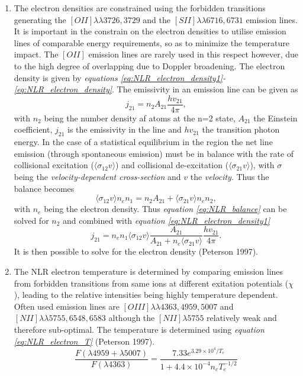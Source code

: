 \documentclass[a4paper, 12pt, twoside]{article}
\begin{document}
\begin{enumerate}
\item The electron densities are constrained using the forbidden transitions generating the $[OII] \lambda\lambda 3726,3729$ and the $[SII] \lambda\lambda 6716,6731$ emission lines. It is important in the constrain on the electron densities to utilise emission lines of comparable energy requirements, so as to minimize the temperature impact. The $[OII]$ emission lines are rarely used in this respect however, due to the high degree of overlapping due to Doppler broadening. The electron density is given by \emph{equations \ref{eq:NLR_electron_density1}-\ref{eq:NLR_electron_density}}. The emissivity in an emission line can be given as
\begin{equation}
j_{21} = n_{2}A_{21}\frac{hv_{21}} {4\pi},
\label{eq:NLR_electron_density1}
\end{equation}
with $n_{2}$ being the number density af atoms at the n=2 state, $A_{21}$ the Einstein coefficient, $j_{21}$ is the emissivity in the line and $hv_{21}$ the transition photon energy. In the case of a statistical equilibrium in the region the net line emission (through spontaneous emission) must be in balance with the rate of collisional excitation ($\langle\sigma_{12}v\rangle$) and collisional de-excitation ($\langle\sigma_{21}v\rangle$), with $\sigma$ being the \emph{velocity-dependent cross-section} and $v$ the \emph{velocity}. Thus the balance becomes
\begin{equation}
\langle\sigma_{12}v\rangle n_{e}n_{1} = n_{2}A_{21} + \langle\sigma_{21}v\rangle n_{e}n_{2},
\label{eq:NLR_balance}
\end{equation}
with $n_{e}$ being the electron density. Thus \emph{equation \ref{eq:NLR_balance}} can be solved for $n_{2}$ and combined with \emph{equation \ref{eq:NLR_electron_density1}}
\begin{equation}
j_{21} = n_{e}n_{1}\langle\sigma_{12}v\rangle \frac{A_{21}}{A_{21}+n_{e}\langle\sigma_{21}v\rangle}\frac{hv_{21}} {4\pi}.
\label{eq:NLR_electron_density}
\end{equation}
It is then possible to solve for the electron density (Peterson 1997).
\item The NLR electron temperature is determined by comparing emission lines from forbidden transitions from same ions at different exitation potentials ($\chi$), leading to the relative intensities being highly temperature dependent. Often used emission lines are $[OIII]\lambda\lambda 4363,4959,5007$ and $[NII] \lambda\lambda 5755,6548,6583$ although the $[NII] \lambda 5755$ relatively weak and therefore sub-optimal. The temperature is determined using \emph{equation \ref{eq:NLR_electron_T}} (Peterson 1997).
\begin{equation}
\frac{F(\lambda4959 + \lambda5007)} {F(\lambda4363)} = \frac{7.33e^{3.29\times10^{4}/T_{e}}} {1 + 4.4\times10^{-4}n_{e}T_{e}^{-1/2}}
\label{eq:NLR_electron_T}
\end{equation}
\end{enumerate}
\end{document}
